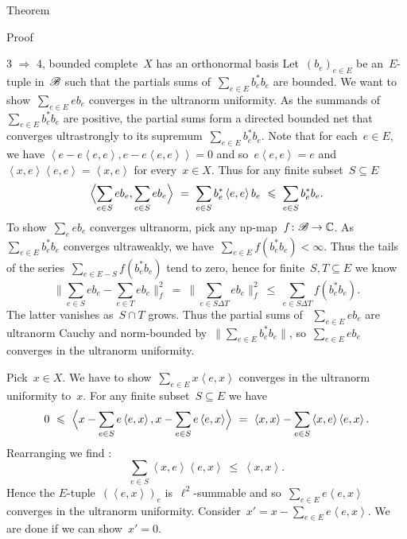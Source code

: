 \documentclass[b]{subfiles}
\begin{document}
\begin{parsec}
\begin{point}{Theorem}
\begin{point}{Proof}
\begin{point}{3
    $\Rightarrow$ 4, bounded complete~$X$ has an orthonormal basis}
Let~$(b_e)_{e \in E}$ be an~$E$-tuple in~$\scrB$
such that the partials sums of~$\sum_{e \in E} b_e^*b_e$ are bounded.
We want to show~$\sum_{e \in E} e b_e$ converges in the ultranorm
    uniformity.
As the summands of~$\sum_{e \in E}b_e^*b_e$ are positive,
    the partial sums form a directed bounded net
    that converges ultrastrongly
    to its supremum~$\sum_{e \in E} b_e^*b_e$.
Note that for each~$e \in E$,
we have
$\left<e-e\left<e,e\right>,e-e\left<e,e\right>\right> = 0$
and so~$e \left<e,e\right> = e$
and~$\left<x,e\right>\left<e,e\right> = \left<x,e\right>$
for every~$x \in X$.
Thus for any finite subset~$S \subseteq E$
\begin{equation*}
    \Bigl<\sum_{e \in S} eb_e, \sum_{e \in S} eb_e\Bigr>
    \ =\  \sum_{e \in S} b_e^* \left<e,e\right>b_e
    \ \leq\  \sum_{e \in S} b_e^*b_e.
\end{equation*}
To show~$\sum_e eb_e$ converges ultranorm,
    pick any np-map~$f\colon \scrB \to \C$.
As~$\sum_{e \in E} b^*_eb_e$ converges ultraweakly,
we have~$\sum_{e \in E} f(b^*_eb_e) < \infty$.
Thus the tails of the series~$\sum_{e \in E - S} f(b_e^*b_e)$ tend to zero, hence for finite~$S,T\subseteq E$ we know
\begin{equation*}
    \bigl\| \sum_{e \in S} eb_e - \sum_{e\in T} eb_e \bigr\|_f^2
        \ =\  \bigl\| \sum_{e \in S\Delta T} eb_e  \bigr\|_f^2
        \ \leq \ \sum_{e \in S\Delta T} f(b_e^*b_e).
\end{equation*}
The latter vanishes as~$S \cap T$ grows.
Thus the partial sums of ~$\sum_{e \in E} eb_e$ are ultranorm Cauchy
and norm-bounded by~$\| \sum_{e \in E} b_e^*b_e \|$,
so~$\sum_{e \in E} eb_e$ converges in the ultranorm uniformity.

Pick~$x \in X$.
We have to show~$\sum_{e \in E} x\left<e,x\right>$
converges in the ultranorm uniformity to~$x$.
For any finite subset~$S \subseteq E$ we have
\begin{equation*}
    0\  \leq\  \Bigl< x - \sum_{e \in S} e\left<e,x\right>,
        x - \sum_{e \in S} e\left<e,x\right> \Bigr>
       \  =\  \left<x,x\right> - \sum_{e \in S} \left<x,e\right>\left<e,x\right>.
\end{equation*}
Rearranging we find :
\begin{equation*}
\sum_{e \in S} \left<x,e\right>\left<e,x\right>
   \  \leq \ \left<x,x\right>.
\end{equation*}
Hence the $E$-tuple~$(\left<e,x\right>)_e$
is~$\ell^2$-summable
and so~$\sum_{e \in E} e \left<e,x\right>$
converges in the ultranorm uniformity.
Consider~$x' = x - \sum_{e \in E} e\left<e,x\right>$.
We are done if we can show~$x' = 0$.


\end{point}
\end{point}
\end{point}
\end{parsec}
\end{document}
